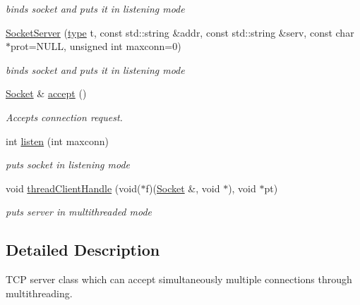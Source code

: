 \begin{CompactItemize}
\begin{CompactList}\small\item\em binds socket and puts it in listening mode \item\end{CompactList}\item 
\hyperlink{classsocketpp_1_1SocketServer_667f8c2b7b1325c80f018ecf85a9551f}{SocketServer} (\hyperlink{namespacesocketpp_635f4c3b3f85aba331587404d59ae52d}{type} t, const std::string \&addr, const std::string \&serv, const char $\ast$prot=NULL, unsigned int maxconn=0)
\begin{CompactList}\small\item\em binds socket and puts it in listening mode \item\end{CompactList}\item 
\hyperlink{classsocketpp_1_1Socket}{Socket} \& \hyperlink{classsocketpp_1_1SocketServer_de24bd723d353d62d034718a1d95c02f}{accept} ()
\begin{CompactList}\small\item\em Accepts connection request. \item\end{CompactList}\item 
int \hyperlink{classsocketpp_1_1SocketServer_034ddc2def5342b5a26264ffcb9e8e36}{listen} (int maxconn)
\begin{CompactList}\small\item\em puts socket in listening mode \item\end{CompactList}\item 
void \hyperlink{classsocketpp_1_1SocketServer_0ded92a6348a6cf953d9f646fac43ac2}{threadClientHandle} (void($\ast$f)(\hyperlink{classsocketpp_1_1Socket}{Socket} \&, void $\ast$), void $\ast$pt)
\begin{CompactList}\small\item\em puts server in multithreaded mode \item\end{CompactList}\end{CompactItemize}


\subsection{Detailed Description}
TCP server class which can accept simultaneously multiple connections through multithreading. 

